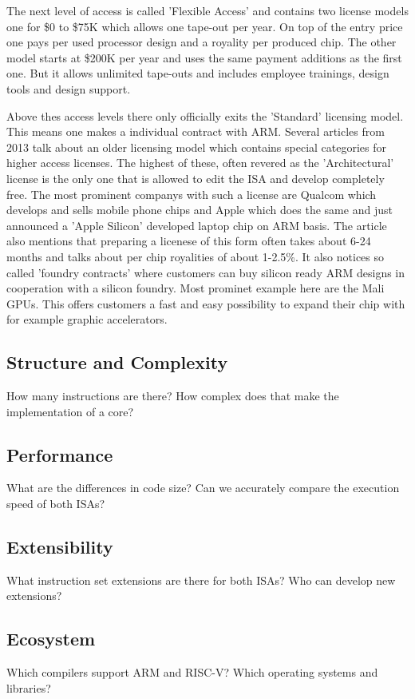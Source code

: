 \documentclass[conference]{IEEEtran}
\begin{document}
	The next level of access is called 'Flexible Access' and contains two license models one for \$0 to \$75K which allows one tape-out per year. On top of the entry price one pays per used processor design and a royality per produced chip. The other model starts at \$200K per year and uses the same payment additions as the first one. But it allows unlimited tape-outs and includes employee trainings, design tools and design support.

	Above thes access levels there only officially exits the 'Standard' licensing model. This means one makes a individual contract with ARM.
	Several articles from 2013 \cite{Demerjian2013}\cite{Demerjian2013a} talk about an older licensing model which contains special categories for higher access licenses. The highest of these, often revered as the 'Architectural' license is the only one that is allowed to edit the \gls{ISA} and develop completely free. The most prominent companys with such a license are Qualcom which develops and sells mobile phone chips and Apple which does the same and just announced a 'Apple Silicon' developed laptop chip on ARM basis. \cite{Apple2020} The article also mentions that preparing a licenese of this form often takes about 6-24 months and talks about per chip royalities of about 1-2.5\%. It also notices so called 'foundry contracts' where customers can buy silicon ready ARM designs in cooperation with a silicon foundry. Most prominet example here are the Mali GPUs. This offers customers a fast and easy possibility to expand their chip with for example graphic accelerators.


	\subsection{Structure and Complexity}
	How many instructions are there? How complex does that make the implementation of a core?
	\subsection{Performance}
	What are the differences in code size? Can we accurately compare the execution speed of both ISAs?
	\subsection{Extensibility}
	What instruction set extensions are there for both ISAs? Who can develop new extensions?
	\subsection{Ecosystem}
	Which compilers support ARM and RISC-V? Which operating systems and libraries?
\end{document}
